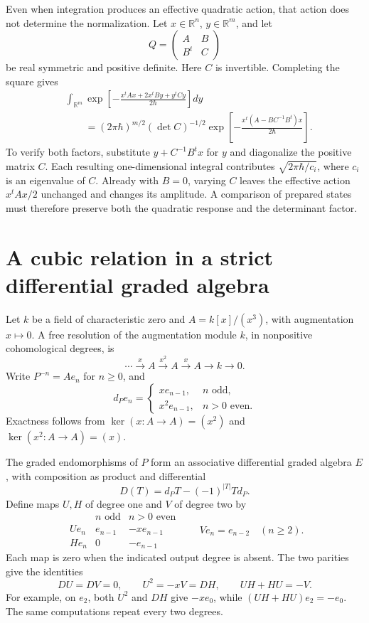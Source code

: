 Even when integration produces an effective quadratic action, that
action does not determine the normalization. Let \(x\in\mathbb R^n\),
\(y\in\mathbb R^m\), and let
\[
 Q=\begin{pmatrix}A&B\\B^t&C\end{pmatrix}
\]
be real symmetric and positive definite. Here \(C\) is invertible.
Completing the square gives
\begin{equation}\label{v4-prologue:eq:elimination}
 \begin{split}
 &\int_{\mathbb R^m}
   \exp\!\left[-\frac{x^tAx+2x^tBy+y^tCy}{2\hbar}\right]dy\\
 &\qquad=(2\pi\hbar)^{m/2}(\det C)^{-1/2}
   \exp\!\left[-\frac{x^t(A-BC^{-1}B^t)x}{2\hbar}\right].
 \end{split}
\end{equation}
To verify both factors, substitute \(y+C^{-1}B^tx\) for \(y\)
and diagonalize the positive matrix \(C\). Each resulting
one-dimensional integral contributes \(\sqrt{2\pi\hbar/c_i}\),
where \(c_i\) is an eigenvalue of \(C\).
Already with \(B=0\), varying \(C\) leaves the effective action
\(x^tAx/2\) unchanged and changes its amplitude. A comparison of
prepared states must therefore preserve both the quadratic response
and the determinant factor.

\section*{A cubic relation in a strict differential graded algebra}
\label{v4-prologue:cubic}

Let \(k\) be a field of characteristic zero and
\(A=k[x]/(x^3)\), with augmentation \(x\mapsto0\).
A free resolution of the augmentation module \(k\), in nonpositive
cohomological degrees, is
\[
 \cdots\xrightarrow{x}A\xrightarrow{x^2}A
 \xrightarrow{x}A\longrightarrow k\longrightarrow0.
\]
Write \(P^{-n}=Ae_n\) for \(n\ge0\), and
\[
 d_Pe_n=\begin{cases}
 xe_{n-1},&n\text{ odd},\\
 x^2e_{n-1},&n>0\text{ even}.
 \end{cases}
\]
Exactness follows from
\(\ker(x:A\to A)=(x^2)\) and
\(\ker(x^2:A\to A)=(x)\).

The graded endomorphisms of \(P\) form an associative differential
graded algebra \(E\), with composition as product and differential
\[
 D(T)=d_PT-(-1)^{|T|}Td_P.
\]
Define maps \(U,H\) of degree one and \(V\) of degree two by
\[
 \begin{array}{c|cc}
 &n\text{ odd}&n>0\text{ even}\\ \hline
 Ue_n&e_{n-1}&-xe_{n-1}\\
 He_n&0&-e_{n-1}
 \end{array}
 \qquad
 Ve_n=e_{n-2}\quad(n\ge2).
\]
Each map is zero when the indicated output degree is absent.
The two parities give the identities
\begin{equation}\label{v4-prologue:eq:cubic-primitives}
 DU=DV=0,\qquad U^2=-xV=DH,\qquad UH+HU=-V.
\end{equation}
For example, on \(e_2\), both \(U^2\) and \(DH\) give
\(-xe_0\), while \((UH+HU)e_2=-e_0\). The same computations
repeat every two degrees.

